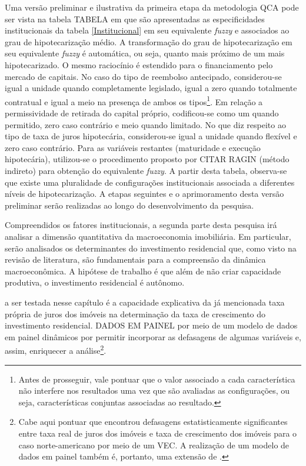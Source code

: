 Uma versão preliminar e ilustrativa da primeira etapa da metodologia QCA pode ser vista na tabela TABELA em que são apresentadas as especificidades institucionais da tabela \ref{Institucional} em seu equivalente \textit{fuzzy} e associados ao grau de hipotecarização médio.
A transformação do grau de hipotecarização em seu equivalente \textit{fuzzy} é automática, ou seja, quanto mais próximo de um mais hipotecarizado. 
O mesmo raciocínio é estendido para o financiamento pelo mercado de capitais.
No caso do tipo de reembolso antecipado, considerou-se igual a unidade quando completamente legislado, igual a zero quando totalmente contratual e igual a meio na presença de ambos os tipos\footnote{Antes de prosseguir, vale pontuar que o valor associado a cada característica não interfere nos resultados uma vez que são avaliadas as configurações, ou seja, características conjuntas associadas ao resultado.}.
Em relação a permissividade de retirada do capital próprio, codificou-se como um quando permitido, zero caso contrário  e meio quando limitado.
No que diz respeito ao tipo de taxa de juros hipotecária, considerou-se igual a unidade quando flexível e zero caso contrário.
Para as variáveis restantes (maturidade e execução hipotecária), utilizou-se o procedimento proposto por CITAR RAGIN (método indireto) para obtenção do equivalente \textit{fuzzy}.
A partir desta tabela, observa-se que existe uma pluralidade de configurações institucionais associada a diferentes níveis de hipotecarização.
A etapas seguintes e o aprimoramento desta versão preliminar serão realizadas ao longo do desenvolvimento da pesquisa.




Compreendidos os fatores institucionais, a segunda parte desta pesquisa irá analisar a dimensão quantitativa da macroeconomia imobiliária.
Em particular, serão analisados os determinantes do investimento residencial que, como visto na revisão de literatura, são fundamentais para a compreensão da dinâmica macroeconômica.
A hipótese de trabalho é que além de não criar capacidade produtiva, o investimento residencial é autônomo.

a ser testada nesse capítulo é a capacidade explicativa da já mencionada taxa própria de juros dos imóveis na determinação da taxa de crescimento do investimento residencial.
DADOS EM PAINEL
por meio de um modelo de dados em painel dinâmicos por permitir incorporar as defasagens de algumas variáveis e, assim, enriquecer a análise\footnote{Cabe aqui pontuar que \textcite{petrini_investimento_2019} encontrou defasagens estatisticamente significantes entre taxa real de juros dos imóveis e taxa de crescimento dos imóveis para o caso norte-americano por meio de um VEC. A realização de um modelo de dados em painel também é, portanto, uma extensão de \textcite{petrini_demanda_2019}.}.


